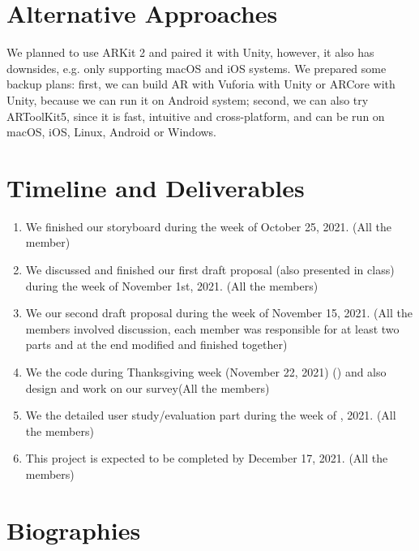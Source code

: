 \documentclass[acmsmall, nonacm]{acmart}
\begin{document}
\section{Alternative Approaches}

We planned to use ARKit 2 and paired it with Unity, however, it also has
downsides, e.g. only supporting macOS and iOS systems. We prepared some backup
plans: first, we can build AR with Vuforia with Unity or ARCore with Unity,
because we can run it on Android system; second, we can also try ARToolKit5,
since it is fast, intuitive and cross-platform, and can be run on macOS, iOS,
Linux, Android or Windows. 

\section{Timeline and Deliverables}

\begin{enumerate}
  \item We finished our storyboard during the week of October 25, 2021. (All the
    member)
  \item We discussed and finished our first draft proposal (also presented in
    class) during the week of November 1st, 2021. (All the members)
  \item We  our second draft proposal during the
    week of November 15, 2021. (All the members involved discussion, each member
    was responsible for at least two parts and at the end modified and finished
    together)
  \item We  the code during
    Thanksgiving week (November 22,
    2021) () and also design and work on our
    survey(All the members)
  \item We  the detailed user
    study/evaluation part during the week of , 2021. (All the members)
  \item This project is expected to be completed by December 17, 2021. (All the
    members)
\end{enumerate}

\section{Biographies}
\end{document}
